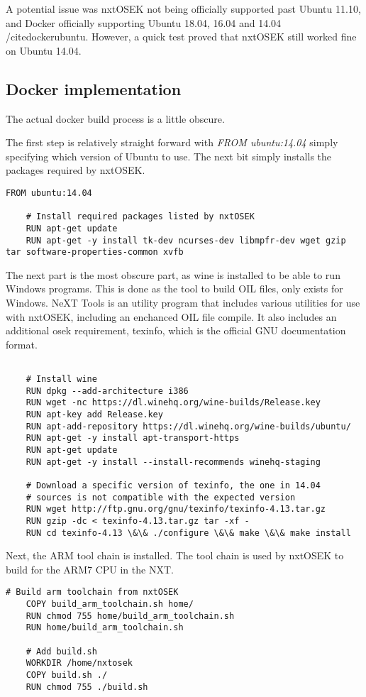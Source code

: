 A potential issue was nxtOSEK not being officially supported past Ubuntu 11.10, and Docker officially supporting Ubuntu 18.04, 16.04 and 14.04 /cite{dockerubuntu}.
However, a quick test proved that nxtOSEK still worked fine on Ubuntu 14.04.

\subsection{Docker implementation}\label{subsec:dockerimplementation}
The actual docker build process is a little obscure.

The first step is relatively straight forward with \textit{FROM ubuntu:14.04} simply specifying which version of Ubuntu to use.
The next bit simply installs the packages required by nxtOSEK.
\begin{lstlisting}[language=docker,label={lst:dockerimplementation1},caption={Version definition and installation of packages required by nxtOSEK}]
    FROM ubuntu:14.04

    # Install required packages listed by nxtOSEK
    RUN apt-get update
    RUN apt-get -y install tk-dev ncurses-dev libmpfr-dev wget gzip tar software-properties-common xvfb
\end{lstlisting} 

The next part is the most obscure part, as wine is installed to be able to run Windows programs.
This is done as the tool to build OIL files, only exists for Windows.
NeXT Tools is an utility program that includes various utilities for use with nxtOSEK, including an enchanced OIL file compile\cite{nxttool}.
It also includes an additional osek requirement, texinfo, which is the official GNU documentation format\cite{texinfo}.

\begin{lstlisting}[language=docker,label={lst:dockerimplementation2},caption={Reee}]

    # Install wine
    RUN dpkg --add-architecture i386
    RUN wget -nc https://dl.winehq.org/wine-builds/Release.key
    RUN apt-key add Release.key
    RUN apt-add-repository https://dl.winehq.org/wine-builds/ubuntu/
    RUN apt-get -y install apt-transport-https
    RUN apt-get update
    RUN apt-get -y install --install-recommends winehq-staging
    
    # Download a specific version of texinfo, the one in 14.04 
    # sources is not compatible with the expected version
    RUN wget http://ftp.gnu.org/gnu/texinfo/texinfo-4.13.tar.gz
    RUN gzip -dc < texinfo-4.13.tar.gz tar -xf -
    RUN cd texinfo-4.13 \&\& ./configure \&\& make \&\& make install
\end{lstlisting} 
Next, the ARM tool chain is installed.
The tool chain is used by nxtOSEK to build for the ARM7 CPU in the NXT.
\begin{lstlisting}[language=docker,label={lst:dockerimplementation3},caption={Reee}]
    # Build arm toolchain from nxtOSEK
    COPY build_arm_toolchain.sh home/
    RUN chmod 755 home/build_arm_toolchain.sh
    RUN home/build_arm_toolchain.sh
    
    # Add build.sh
    WORKDIR /home/nxtosek
    COPY build.sh ./
    RUN chmod 755 ./build.sh
\end{lstlisting}

